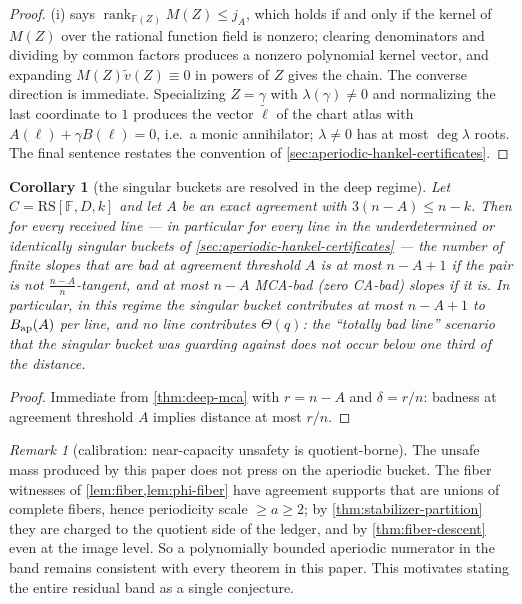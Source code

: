 \documentclass[11pt]{article}
\newtheorem{corollary}[theorem]{Corollary}
\theoremstyle{definition}
\theoremstyle{remark}
\newtheorem{remark}[theorem]{Remark}
\newcommand{\F}{\mathbb{F}}
\newcommand{\RS}{\mathrm{RS}}
\begin{document}
\begin{proof}
(i) says $\operatorname{rank}_{\F(Z)}M(Z)\le j_A$, which holds if and only if the kernel of $M(Z)$ over the rational function field is nonzero; clearing denominators and dividing by common factors produces a nonzero polynomial kernel vector, and expanding $M(Z)\widetilde v(Z)\equiv0$ in powers of $Z$ gives the chain. The converse direction is immediate. Specializing $Z=\gamma$ with $\lambda(\gamma)\ne0$ and normalizing the last coordinate to $1$ produces the vector $\widetilde\ell$ of the chart atlas with $A(\ell)+\gamma B(\ell)=0$, i.e.\ a monic annihilator; $\lambda\ne0$ has at most $\deg\lambda$ roots. The final sentence restates the convention of \cref{sec:aperiodic-hankel-certificates}.
\end{proof}

\begin{corollary}[the singular buckets are resolved in the deep regime]\label{cor:singular-deep}
Let $C=\RS[\F,D,k]$ and let $A$ be an exact agreement with $3(n-A)\le n-k$. Then for every received line --- in particular for every line in the underdetermined or identically singular buckets of \cref{sec:aperiodic-hankel-certificates} --- the number of finite slopes that are bad at agreement threshold $A$ is at most $n-A+1$ if the pair is not $\frac{n-A}n$-tangent, and at most $n-A$ MCA-bad \textup(zero CA-bad\textup) slopes if it is. In particular, in this regime the singular bucket contributes at most $n-A+1$ to $B_{\rm ap}(A)$ per line, and no line contributes $\Theta(q)$: the ``totally bad line'' scenario that the singular bucket was guarding against does not occur below one third of the distance.
\end{corollary}

\begin{proof}
Immediate from \cref{thm:deep-mca} with $r=n-A$ and $\delta=r/n$: badness at agreement threshold $A$ implies distance at most $r/n$.
\end{proof}

\begin{remark}[calibration: near-capacity unsafety is quotient-borne]\label{rem:quotient-borne}
The unsafe mass produced by this paper does not press on the aperiodic bucket. The fiber witnesses of \cref{lem:fiber,lem:phi-fiber} have agreement supports that are unions of complete fibers, hence periodicity scale $\ge a\ge2$; by \cref{thm:stabilizer-partition} they are charged to the quotient side of the ledger, and by \cref{thm:fiber-descent} even at the image level. So a polynomially bounded aperiodic numerator in the band remains consistent with every theorem in this paper. This motivates stating the entire residual band as a single conjecture.
\end{remark}
\end{document}
